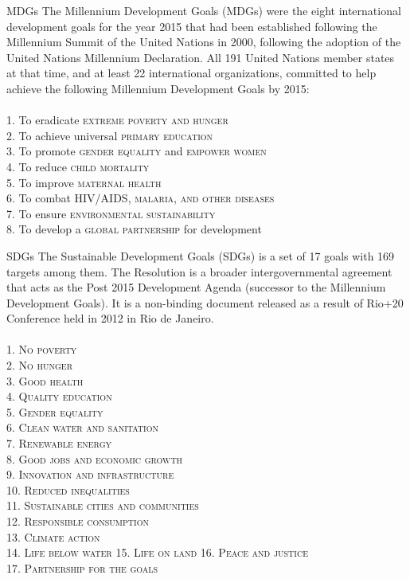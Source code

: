 \begin{sortEnvironment}{MDGs}
The Millennium Development Goals (MDGs) were the eight international development goals for the year 2015 that had been established following the Millennium Summit of the United Nations in 2000, following the adoption of the United Nations Millennium Declaration. All 191 United Nations member states at that time, and at least 22 international organizations, committed to help achieve the following Millennium Development Goals by 2015: \\
\\
1. To eradicate \textsc{extreme poverty and hunger} \\
2. To achieve universal \textsc{primary education} \\
3. To promote \textsc{gender equality} and \textsc{empower women} \\
4. To reduce \textsc{child mortality} \\
5. To improve \textsc{maternal health} \\
6. To combat \textsc{HIV/AIDS, malaria, and other diseases} \\
7. To ensure \textsc{environmental sustainability} \\
8. To develop a \textsc{global partnership} for development
\end{sortEnvironment}

\begin{sortEnvironment}{SDGs}
The Sustainable Development Goals (SDGs) is a set of 17 goals with 169 targets among them. The Resolution is a broader intergovernmental agreement that acts as the Post 2015 Development Agenda (successor to the Millennium Development Goals). It is a non-binding document released as a result of Rio+20 Conference held in 2012 in Rio de Janeiro. \\
\\
\textsc{
1. No poverty \\
2. No hunger \\
3. Good health \\
4. Quality education \\
5. Gender equality \\
6. Clean water and sanitation \\
7. Renewable energy \\
8. Good jobs and economic growth \\
9. Innovation and infrastructure \\
10. Reduced inequalities \\
11. Sustainable cities and communities \\
12. Responsible consumption \\
13. Climate action \\
14. Life below water
15. Life on land
16. Peace and justice \\
17. Partnership for the goals
} 

\end{sortEnvironment}

